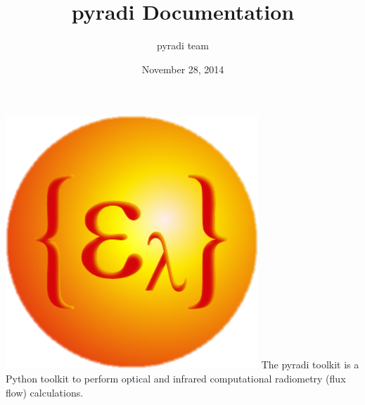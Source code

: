 \documentclass[a4paper,10pt,english]{sphinxmanual}
\title{pyradi Documentation}
\date{November 28, 2014}
\author{pyradi team}
\begin{document}
\maketitle
\tableofcontents
{}\label{index::doc}


{\includegraphics{pyradi.png}\hfill}
\label{index:module-pyradi}
The pyradi toolkit is a Python toolkit to perform optical and infrared 
computational radiometry (flux flow) calculations.
\end{document}
